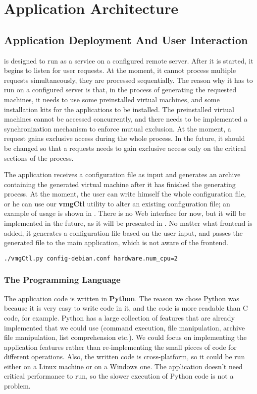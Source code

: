 \chapter{Application Architecture}
\label{chapter:architecture}

\section{Application Deployment And User Interaction}
\label{sec:app-deploy}
\project is designed to run as a service on a configured remote server. After
it is started, it begins to listen for user requests. At the moment, it cannot
process multiple requests simultaneously, they are processed sequentially. The
reason why it has to run on a configured server is that, in the process of
generating the requested machines, it needs to use some preinstalled virtual
machines, and some installation kits for the applications to be installed. The
preinstalled virtual machines cannot be accessed concurrently, and there needs
to be implemented a synchronization mechanism to enforce mutual exclusion. At
the moment, a request gains exclusive access during the whole process. In the
future, it should be changed so that a requests needs to gain exclusive access
only on the critical sections of the process.

The application receives a configuration file as input and generates an archive
containing the generated virtual machine after it has finished the generating
process. At the moment, the user can write himself the whole configuration
file, or he can use our \textbf{vmgCtl} utility to alter an existing
configuration file; an example of usage is shown in
. There is no Web interface for now, but
it will be implemented in the future, as it will be presented in
. No matter what frontend is added, it
generates a configuration file based on the user input, and passes the
generated file to the main application, which is not aware of the frontend.

\lstset{caption=vmgCtl usage example,label=lst:vmgctl-exp}
\begin{lstlisting}
./vmgCtl.py config-debian.conf hardware.num_cpu=2
\end{lstlisting}

\subsection{The Programming Language}
\label{sub-sec:prog-lang}
The application code is written in \textbf{Python}. The reason we chose Python
was because it is very easy to write code in it, and the code is more readable
than C code, for example. Python has a large collection of features that are
already implemented that we could use (command execution, file manipulation,
archive file manipulation, list comprehension etc.). We could focus on
implementing the application features rather than re-implementing the small
pieces of code for different operations. Also, the written code is
cross-platform, so it could be run either on a Linux machine or on a Windows
one. The application doesn't need critical performance to run, so the slower
execution of Python code is not a problem.

